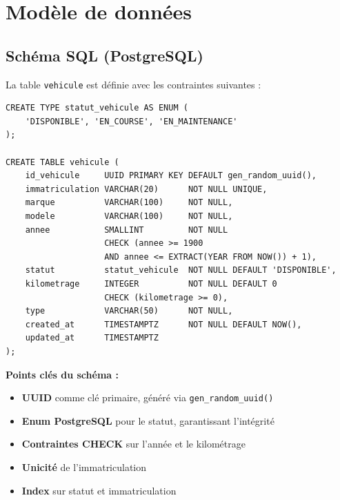 \documentclass[12pt,a4paper]{report}
\begin{document}
\chapter{Mod\`ele de donn\'ees}

\section{Sch\'ema SQL (PostgreSQL)}

La table \texttt{vehicule} est d\'efinie avec les contraintes suivantes :

\begin{lstlisting}[style=sqlstyle, caption={Script SQL de cr\'eation de la table vehicule}]
CREATE TYPE statut_vehicule AS ENUM (
    'DISPONIBLE', 'EN_COURSE', 'EN_MAINTENANCE'
);

CREATE TABLE vehicule (
    id_vehicule     UUID PRIMARY KEY DEFAULT gen_random_uuid(),
    immatriculation VARCHAR(20)      NOT NULL UNIQUE,
    marque          VARCHAR(100)     NOT NULL,
    modele          VARCHAR(100)     NOT NULL,
    annee           SMALLINT         NOT NULL
                    CHECK (annee >= 1900
                    AND annee <= EXTRACT(YEAR FROM NOW()) + 1),
    statut          statut_vehicule  NOT NULL DEFAULT 'DISPONIBLE',
    kilometrage     INTEGER          NOT NULL DEFAULT 0
                    CHECK (kilometrage >= 0),
    type            VARCHAR(50)      NOT NULL,
    created_at      TIMESTAMPTZ      NOT NULL DEFAULT NOW(),
    updated_at      TIMESTAMPTZ
);
\end{lstlisting}

\begin{infobox}
\textbf{Points cl\'es du sch\'ema :}
\begin{itemize}[nosep]
    \item \textbf{UUID} comme cl\'e primaire, g\'en\'er\'e via \texttt{gen\_random\_uuid()}
    \item \textbf{Enum PostgreSQL} pour le statut, garantissant l'int\'egrit\'e
    \item \textbf{Contraintes CHECK} sur l'ann\'ee et le kilom\'etrage
    \item \textbf{Unicit\'e} de l'immatriculation
    \item \textbf{Index} sur statut et immatriculation
\end{itemize}
\end{infobox}
\end{document}
